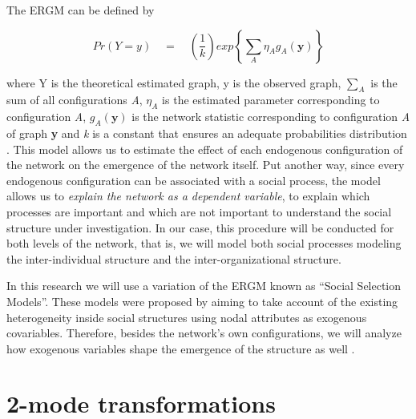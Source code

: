 \documentclass[a4paper, 12pt, openright, oneside, german, french, brazil, english]{abntex2}
\begin{document}
	The ERGM can be defined by
	
		
	$$Pr(Y=y) \quad = \quad \left(\frac{1}{k}\right) exp \left\{ \sum_{A} \eta_A g_A (\textbf{y}) \right\}$$
	
	where Y is the theoretical estimated graph, y is the observed graph, $\sum_{A}$ is the sum of all configurations \textit{A},  $\eta_A$ is the estimated parameter corresponding to configuration \textit{A}, $g_A(\textbf{y})$ is the network statistic corresponding to configuration \textit{A} of graph \textbf{y} and \textit{k} is a constant that ensures an adequate probabilities distribution \cite{robins2007introduction}. This model allows us to estimate the effect of each endogenous configuration of the network on the emergence of the network itself. Put another way, since every endogenous configuration can be associated with a social process, the model allows us to \textit{explain the network as a dependent variable}, to explain which processes are important and which are not important to understand the social structure under investigation. In our case, this procedure will be conducted for both levels of the network, that is, we will model both social processes modeling the inter-individual structure and the inter-organizational structure.
		
	
	In this research we will use a variation of the ERGM known as ``Social Selection Models''. These models were proposed by  aiming to take account of the existing heterogeneity inside social structures using nodal attributes as exogenous covariables. Therefore, besides the network's own configurations, we will analyze how exogenous variables shape the emergence of the structure as well \cite{wang2016social}.
	
	
	\section{2-mode transformations}
\end{document}
